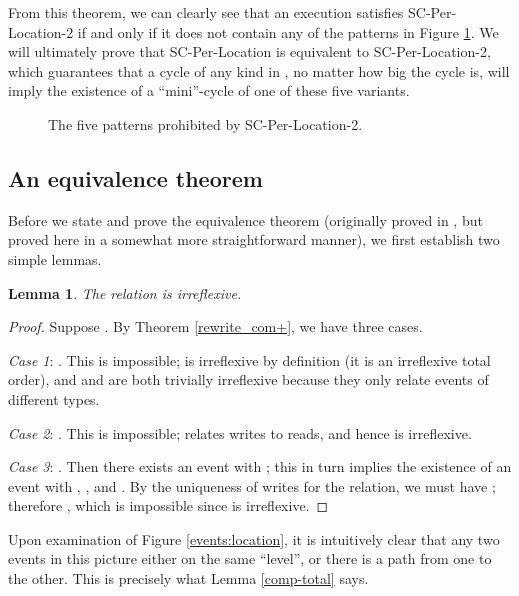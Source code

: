 \documentclass[]{eptcs}
\newtheorem{lemma}[theorem]{Lemma}
\begin{document}
From this theorem, we can clearly see that an execution satisfies SC-Per-Location-2 if and only if it does not contain any of the patterns in Figure \ref{patterns}. We will ultimately prove that SC-Per-Location is equivalent to SC-Per-Location-2, which guarantees that a cycle of any kind in , no matter how big the cycle is, will imply the existence of a ``mini''-cycle of one of these five variants.

\begin{figure}



\caption{The five patterns prohibited by SC-Per-Location-2.}
\label{patterns}
\end{figure}

\subsection{An equivalence theorem}

Before we state and prove the equivalence theorem (originally proved in \cite{alglave_thesis}, but proved here in a somewhat more straightforward manner), we first establish two simple lemmas.
\begin{lemma}\label{com-acyclic}
The relation  is irreflexive.
\end{lemma}
\begin{proof}
Suppose . By Theorem \ref{rewrite_com+}, we have three cases.

\emph{Case 1}: . This is impossible;  is irreflexive by definition (it is an irreflexive total order), and  and  are both trivially irreflexive because they only relate events of different types.

\emph{Case 2}: . This is impossible;  relates writes to reads, and hence is irreflexive.

\emph{Case 3}: . Then there exists an event  with ; this in turn implies the existence of an event  with , , and . By the uniqueness of writes for the  relation, we must have ; therefore , which is impossible since  is irreflexive.
\end{proof}

Upon examination of Figure \ref{events:location}, it is intuitively clear that any two events in this picture either on the same ``level'', or there is a path from one to the other. This is precisely what Lemma \ref{comp-total} says.
\end{document}

